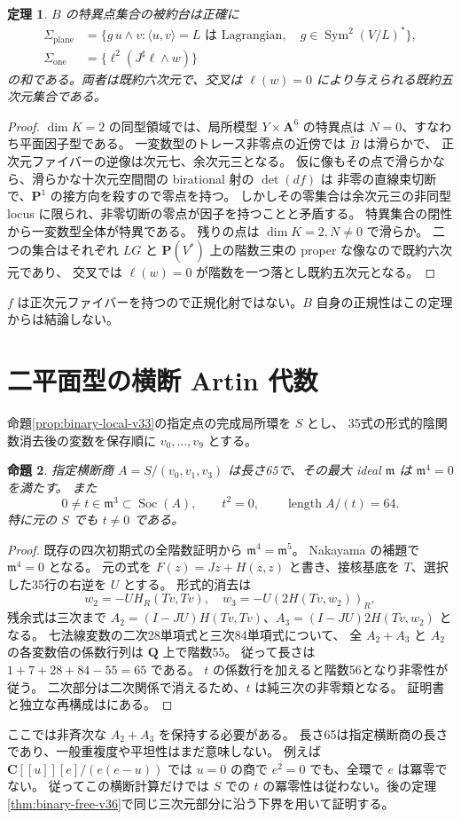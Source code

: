 \documentclass[11pt,a4paper]{ltjsarticle}
\newcommand{\CC}{\mathbf C}
\newcommand{\QQ}{\mathbf Q}
\newcommand{\PP}{\mathbf P}
\renewcommand{\AA}{\mathbf A}
\newtheorem{theorem}{定理}[section]
\newtheorem{proposition}[theorem]{命題}
\theoremstyle{remark}
\begin{document}
\begin{theorem}
$B$ の特異点集合の被約台は正確に
\[
\begin{split}
 \Sigma_{\mathrm{plane}}&=\{g\,u\wedge v:\langle u,v\rangle=L\text{ は Lagrangian},\quad g\in\operatorname{Sym}^2(V/L)^*\},\\
 \Sigma_{\mathrm{one}}&=\{\ell^2(J^\sharp\ell\wedge w)\}
\end{split}
\]
の和である。両者は既約六次元で、交叉は $\ell(w)=0$ により与えられる既約五次元集合である。
\end{theorem}
\begin{proof}
$\dim K=2$ の同型領域では、局所模型 $Y\times\AA^6$ の特異点は $N=0$、すなわち平面因子型である。
一変数型のトレース非零点の近傍では $\widetilde B$ は滑らかで、
正次元ファイバーの逆像は次元七、余次元三となる。
仮に像もその点で滑らかなら、滑らかな十次元空間間の birational 射の $\det(df)$ は
非零の直線束切断で、$\PP^1$ の接方向を殺すので零点を持つ。
しかしその零集合は余次元三の非同型 locus に限られ、非零切断の零点が因子を持つことと矛盾する。
特異集合の閉性から一変数型全体が特異である。
残りの点は $\dim K=2,N\ne0$ で滑らか。
二つの集合はそれぞれ $LG$ と $\PP(V^*)$ 上の階数三束の proper な像なので既約六次元であり、
交叉では $\ell(w)=0$ が階数を一つ落とし既約五次元となる。
\end{proof}
$f$ は正次元ファイバーを持つので正規化射ではない。$B$ 自身の正規性はこの定理からは結論しない。

\section{二平面型の横断 Artin 代数}
命題\ref{prop:binary-local-v33}の指定点の完成局所環を $S$ とし、
35式の形式的陰関数消去後の変数を保存順に $v_0,\ldots,v_9$ とする。
\begin{proposition}
指定横断商 $A=S/(v_0,v_1,v_3)$ は長さ65で、その最大 ideal $\mathfrak m$ は $\mathfrak m^4=0$ を満たす。
また
\[
 0\ne t\in\mathfrak m^3\subset\operatorname{Soc}(A),\qquad
 t^2=0,\qquad\operatorname{length}A/(t)=64.
\]
特に元の $S$ でも $t\ne0$ である。
\end{proposition}
\begin{proof}
既存の四次初期式の全階数証明から $\mathfrak m^4=\mathfrak m^5$。
Nakayama の補題で $\mathfrak m^4=0$ となる。
元の式を $F(z)=Jz+H(z,z)$ と書き、接核基底を $T$、選択した35行の右逆を $U$ とする。
形式的消去は
\[
 w_2=-UH_R(Tv,Tv),\quad w_3=-U(2H(Tv,w_2))_R,
\]
残余式は三次まで
$A_2=(I-JU)H(Tv,Tv)$、$A_3=(I-JU)2H(Tv,w_2)$ となる。
七法線変数の二次28単項式と三次84単項式について、
全 $A_2+A_3$ と $A_2$ の各変数倍の係数行列は $\QQ$ 上で階数55。
従って長さは $1+7+28+84-55=65$ である。
$t$ の係数行を加えると階数56となり非零性が従う。
二次部分は二次関係で消えるため、$t$ は純三次の非零類となる。
証明書と独立な再構成は\cite{binary-artin-v34}にある。
\end{proof}
ここでは非斉次な $A_2+A_3$ を保持する必要がある。
長さ65は指定横断商の長さであり、一般重複度や平坦性はまだ意味しない。
例えば $\CC[[u]][e]/(e(e-u))$ では $u=0$ の商で $e^2=0$ でも、全環で $e$ は冪零でない。
従ってこの横断計算だけでは $S$ での $t$ の冪零性は従わない。後の定理\ref{thm:binary-free-v36}で同じ三次元部分に沿う下界を用いて証明する。
\end{document}

